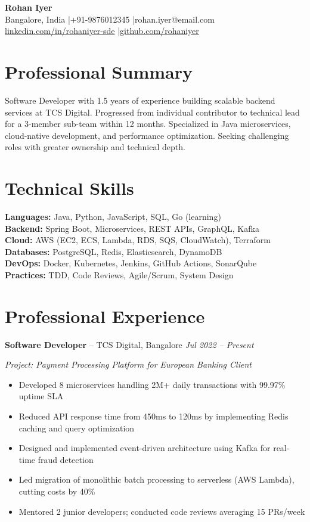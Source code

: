 \documentclass[10pt,a4paper]{article}
\begin{document}
\begin{center}
{\fontsize{20}{24}\selectfont\bfseries\color{accent}Rohan Iyer}\\[5pt]
{\small Bangalore, India \enspace|\enspace +91-9876012345 \enspace|\enspace rohan.iyer@email.com}\\[2pt]
{\small \href{https://linkedin.com/in/rohaniyer-sde}{linkedin.com/in/rohaniyer-sde} \enspace|\enspace \href{https://github.com/rohaniyer}{github.com/rohaniyer}}
\end{center}

\section{Professional Summary}
Software Developer with 1.5 years of experience building scalable backend services at TCS Digital. Progressed from individual contributor to technical lead for a 3-member sub-team within 12 months. Specialized in Java microservices, cloud-native development, and performance optimization. Seeking challenging roles with greater ownership and technical depth.

\section{Technical Skills}
\textbf{Languages:} Java, Python, JavaScript, SQL, Go (learning)\\
\textbf{Backend:} Spring Boot, Microservices, REST APIs, GraphQL, Kafka\\
\textbf{Cloud:} AWS (EC2, ECS, Lambda, RDS, SQS, CloudWatch), Terraform\\
\textbf{Databases:} PostgreSQL, Redis, Elasticsearch, DynamoDB\\
\textbf{DevOps:} Docker, Kubernetes, Jenkins, GitHub Actions, SonarQube\\
\textbf{Practices:} TDD, Code Reviews, Agile/Scrum, System Design

\section{Professional Experience}
\textbf{Software Developer} -- TCS Digital, Bangalore \hfill \textit{\color{accent}Jul 2022 -- Present}

\textit{Project: Payment Processing Platform for European Banking Client}
\begin{itemize}
    \item Developed 8 microservices handling 2M+ daily transactions with 99.97\% uptime SLA
    \item Reduced API response time from 450ms to 120ms by implementing Redis caching and query optimization
    \item Designed and implemented event-driven architecture using Kafka for real-time fraud detection
    \item Led migration of monolithic batch processing to serverless (AWS Lambda), cutting costs by 40\%
    \item Mentored 2 junior developers; conducted code reviews averaging 15 PRs/week
\end{itemize}
\end{document}
